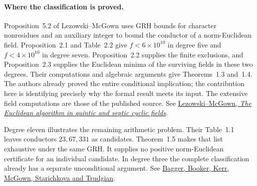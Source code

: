 \paragraph{Where the classification is proved.}
Proposition~5.2 of Lezowski--McGown uses GRH bounds for character nonresidues and an auxiliary integer to bound the conductor of a norm-Euclidean field. Proposition~2.1 and Table~2.2 give $f<6\times10^{10}$ in degree five and $f<4\times10^{10}$ in degree seven. Proposition~2.2 supplies the finite exclusions, and Proposition~2.3 supplies the Euclidean minima of the surviving fields in these two degrees. Their computations and algebraic arguments give Theorems~1.3 and~1.4. The authors already proved the entire conditional implication; the contribution here is identifying precisely why the formal result meets its input. The extensive field computations are those of the published source. See \href{https://doi.org/10.1090/mcom/3169}{Lezowski--McGown, \emph{The Euclidean algorithm in quintic and septic cyclic fields}}.

Degree eleven illustrates the remaining arithmetic problem. Their Table~1.1 leaves conductors $23,67,331$ as candidates. Theorem~1.5 makes that list exhaustive under the same GRH. It supplies no positive norm-Euclidean certificate for an individual candidate. In degree three the complete classification already has a separate unconditional argument. See \href{https://arxiv.org/abs/2507.05862}{Bagger, Booker, Kerr, McGown, Starichkova and Trudgian}.
